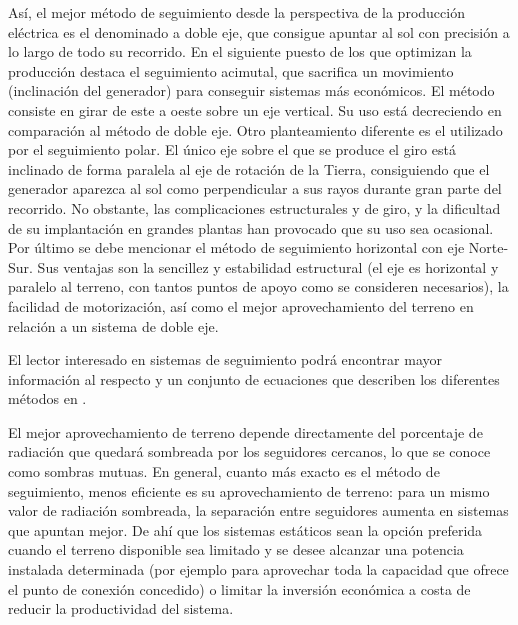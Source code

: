 Así, el mejor método de seguimiento desde la perspectiva de la producción
eléctrica es el denominado a doble eje, que consigue apuntar al sol
con precisión a lo largo de todo su recorrido. En el siguiente puesto
de los que optimizan la producción destaca el seguimiento acimutal,
que sacrifica un movimiento (inclinación del generador) para conseguir
sistemas más económicos. El método consiste en girar de este a oeste
sobre un eje vertical. Su uso está decreciendo en comparación al método
de doble eje. Otro planteamiento diferente es el utilizado por el
seguimiento polar. El único eje sobre el que se produce el giro está
inclinado de forma paralela al eje de rotación de la Tierra, consiguiendo
que el generador aparezca al sol como perpendicular a sus rayos durante
gran parte del recorrido. No obstante, las complicaciones estructurales
y de giro, y la dificultad de su implantación en grandes plantas han
provocado que su uso sea ocasional. Por último se debe mencionar el
método de seguimiento horizontal con eje Norte-Sur. Sus ventajas son
la sencillez y estabilidad estructural (el eje es horizontal y paralelo
al terreno, con tantos puntos de apoyo como se consideren necesarios),
la facilidad de motorización, así como el mejor aprovechamiento del
terreno en relación a un sistema de doble eje.

El lector interesado en sistemas de seguimiento podrá encontrar mayor
información al respecto y un conjunto de ecuaciones que describen
los diferentes métodos en \citep{Perpinan2008}. 

El mejor aprovechamiento de terreno depende directamente del porcentaje
de radiación que quedará sombreada por los seguidores cercanos, lo
que se conoce como sombras mutuas. En general, cuanto más exacto es
el método de seguimiento, menos eficiente es su aprovechamiento de
terreno: para un mismo valor de radiación sombreada, la separación
entre seguidores aumenta en sistemas que apuntan mejor. De ahí que
los sistemas estáticos sean la opción preferida cuando el terreno
disponible sea limitado y se desee alcanzar una potencia instalada
determinada (por ejemplo para aprovechar toda la capacidad que ofrece
el punto de conexión concedido) o limitar la inversión económica a
costa de reducir la productividad del sistema.

